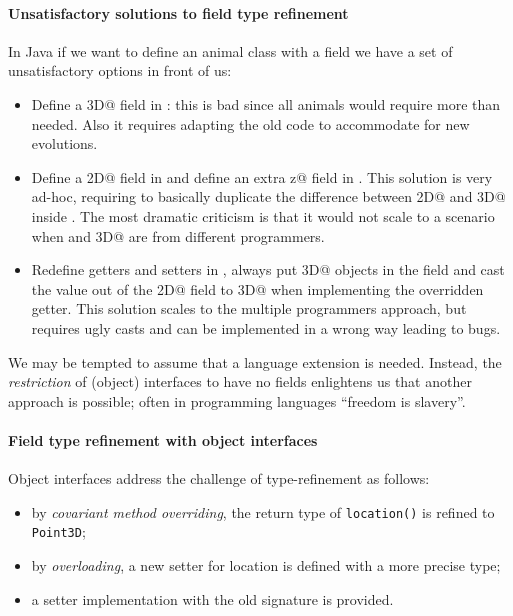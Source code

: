 \paragraph{Unsatisfactory \classbased solutions to field type refinement}
In Java if we want to define an animal class with a field we have a set of
unsatisfactory options in front of us:
\begin{itemize}
\item Define a \Q@Point3D@ field in \Q@Animal@: this is bad since all animals
  would require more than needed.
  Also it requires adapting the old code to accommodate for new evolutions.

\item Define a \Q@Point2D@ field in \Q@Animal@ and define an extra \Q@int z@
  field in \Q@Bird@.  This solution is very ad-hoc, requiring to basically
  duplicate the difference between \Q@Point2D@ and \Q@Point3D@ inside \Q@Bird@.
  The most dramatic criticism is that it would not scale to a scenario when
  \Q@Bird@ and \Q@Point3D@ are from different programmers.

\item Redefine getters and setters in \Q@Bird@, always put \Q@Point3D@ objects
  in the field and cast the value out of the \Q@Point2D@ field to \Q@Point3D@
  when implementing the overridden getter.  This solution scales to the multiple
  programmers approach, but requires ugly casts and can be implemented in a
  wrong way leading to bugs.
\end{itemize}

We may be tempted to assume that a language extension is needed.
Instead, the \emph{restriction} of (object) interfaces to have no
fields enlightens us that another approach is possible; often in programming languages ``freedom is slavery''.

\paragraph{Field type refinement with object interfaces}
Object interfaces address the challenge of type-refinement as follows:
\begin{itemize}
\item by \emph{covariant method overriding}, the return type of
  \texttt{location()} is refined to \texttt{Point3D};
\item by \emph{overloading}, a new setter for location is defined with a more
  precise type;
\item a \Q@default@ setter implementation with the old signature is provided.
\end{itemize}

